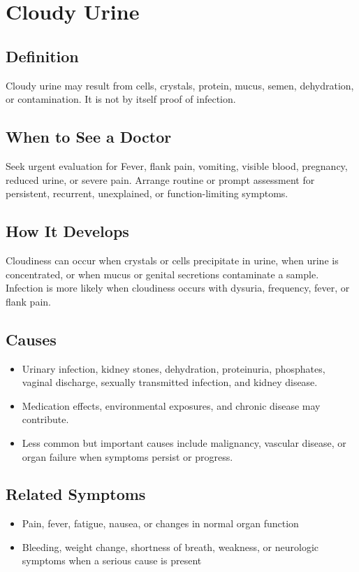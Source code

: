 \chapter{Cloudy Urine}

\section*{Definition}
Cloudy urine may result from cells, crystals, protein, mucus, semen, dehydration, or contamination. It is not by itself proof of infection.

\section*{When to See a Doctor}
Seek urgent evaluation for Fever, flank pain, vomiting, visible blood, pregnancy, reduced urine, or severe pain. Arrange routine or prompt assessment for persistent, recurrent, unexplained, or function-limiting symptoms.

\section*{How It Develops}
Cloudiness can occur when crystals or cells precipitate in urine, when urine is concentrated, or when mucus or genital secretions contaminate a sample. Infection is more likely when cloudiness occurs with dysuria, frequency, fever, or flank pain.

\section*{Causes}
\begin{itemize}
  \item Urinary infection, kidney stones, dehydration, proteinuria, phosphates, vaginal discharge, sexually transmitted infection, and kidney disease.
  \item Medication effects, environmental exposures, and chronic disease may contribute.
  \item Less common but important causes include malignancy, vascular disease, or organ failure when symptoms persist or progress.
\end{itemize}

\section*{Related Symptoms}
\begin{itemize}
  \item Pain, fever, fatigue, nausea, or changes in normal organ function
  \item Bleeding, weight change, shortness of breath, weakness, or neurologic symptoms when a serious cause is present
\end{itemize}

